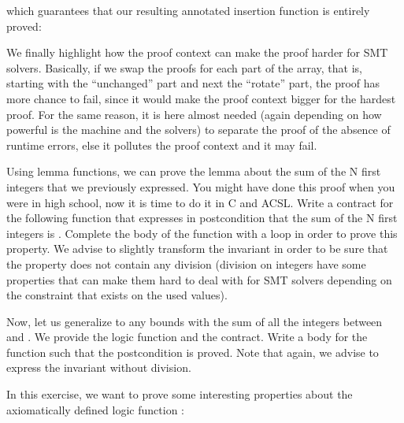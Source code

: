 

which guarantees that our resulting annotated insertion function is entirely
proved:




We finally highlight how the proof context can make the proof harder for SMT
solvers. Basically, if we swap the proofs for each part of the array, that is,
starting with the ``unchanged'' part and next the ``rotate'' part, the proof has
more chance to fail, since it would make the proof context bigger for the
hardest proof. For the same reason, it is here almost needed (again depending
on how powerful is the machine and the solvers) to separate the proof of the
absence of runtime errors, else it pollutes the proof context and it may fail.






Using lemma functions, we can prove the lemma about the sum of the N first
integers that we previously expressed. You might have done this proof when you
were in high school, now it is time to do it in C and ACSL. Write a contract for
the following function that expresses in postcondition that the sum of the N
first integers is . Complete the body of the function with
a loop in order to prove this property. We advise to slightly transform the
invariant in order to be sure that the property does not contain any division
(division on integers have some properties that can make them hard to deal with
for SMT solvers depending on the constraint that exists on the used values).




Now, let us generalize to any bounds with the sum of all the integers between
 and . We provide the logic function and the
contract. Write a body for the function such that the postcondition is proved.
Note that again, we advise to express the invariant without division.






In this exercise, we want to prove some interesting properties about the
axiomatically defined logic function :


